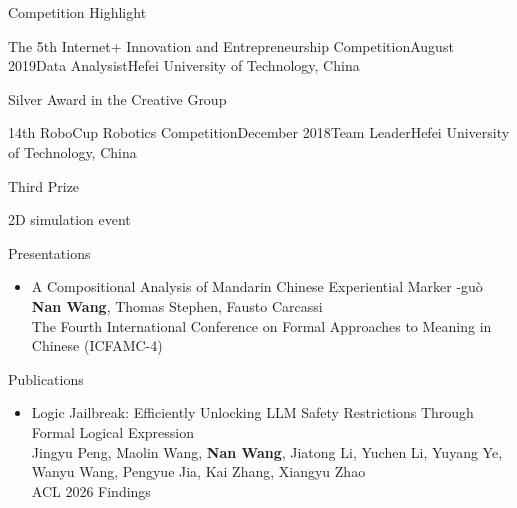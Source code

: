 \documentclass[
	11pt, %
]{resume} %
\begin{document}

\begin{rSection}{Competition Highlight}


	\begin{rSubsection}{The 5th Internet+ Innovation and Entrepreneurship Competition}{August 2019}{Data Analysist}{Hefei University of Technology, China}
		\item Silver Award in the Creative Group
	\end{rSubsection}

	\begin{rSubsection}{14th RoboCup Robotics Competition}{December 2018}{Team Leader}{Hefei University of Technology, China}
		\item Third Prize
		\item 2D simulation event
	\end{rSubsection}
\end{rSection}


\begin{rSection}{Presentations}
	\begin{itemize}
		\item A Compositional Analysis of Mandarin Chinese Experiential Marker -guò\\
		\textbf{Nan Wang}, Thomas Stephen, Fausto Carcassi\\
		The Fourth International Conference on Formal Approaches to Meaning in Chinese (ICFAMC-4)
	\end{itemize}

\end{rSection}

\begin{rSection}{Publications}
	\begin{itemize}
		\item Logic Jailbreak: Efficiently Unlocking LLM Safety Restrictions Through Formal Logical Expression\\
		Jingyu Peng, Maolin Wang, \textbf{Nan Wang}, Jiatong Li, Yuchen Li, Yuyang Ye, Wanyu Wang, Pengyue Jia, Kai Zhang, Xiangyu Zhao\\
		ACL 2026 Findings
	\end{itemize}
\end{rSection}
\end{document}
